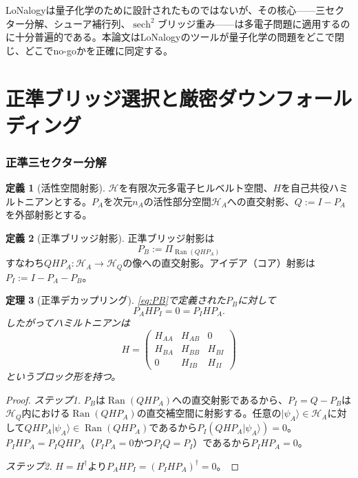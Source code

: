 \documentclass[12pt]{article}
\theoremstyle{plain}
\newtheorem{theorem}{定理}[section]
\theoremstyle{definition}
\newtheorem{definition}[theorem]{定義}
\numberwithin{equation}{section}
\DeclareMathOperator{\Ran}{Ran}
\DeclareMathOperator{\sech}{sech}
\begin{document}
LoNalogyは量子化学のために設計されたものではないが、その核心——三セクター分解、シューア補行列、$\sech^2$ブリッジ重み——は多電子問題に適用するのに十分普遍的である。本論文はLoNalogyのツールが量子化学の問題をどこで閉じ、どこでno-goかを正確に同定する。


\part{正準ブリッジ選択と厳密ダウンフォールディング}

\section{正準三セクター分解}\label{sec:canonical}

\begin{definition}[活性空間射影]\label{def:active}
$\mathcal{H}$を有限次元多電子ヒルベルト空間、$H$を自己共役ハミルトニアンとする。$P_A$を次元$n_A$の活性部分空間$\mathcal{H}_A$への直交射影、$Q:=I-P_A$を外部射影とする。
\end{definition}

\begin{definition}[正準ブリッジ射影]\label{def:bridge}
正準ブリッジ射影は
\begin{equation}\label{eq:PB}
\boxed{P_B := \Pi_{\Ran(QHP_A)}}
\end{equation}
すなわち$QHP_A:\mathcal{H}_A\to\mathcal{H}_Q$の像への直交射影。アイデア（コア）射影は$P_I := I - P_A - P_B$。
\end{definition}

\begin{theorem}[正準デカップリング]\label{thm:decoupling}
\eqref{eq:PB}で定義された$P_B$に対して
\begin{equation}\label{eq:decoupling}
\boxed{P_A H P_I = 0 = P_I H P_A.}
\end{equation}
したがってハミルトニアンは
\begin{equation}\label{eq:blockH}
H = \begin{pmatrix} H_{AA} & H_{AB} & 0\\ H_{BA} & H_{BB} & H_{BI}\\ 0 & H_{IB} & H_{II} \end{pmatrix}
\end{equation}
というブロック形を持つ。
\end{theorem}

\begin{proof}
\emph{ステップ1.} $P_B$は$\Ran(QHP_A)$への直交射影であるから、$P_I=Q-P_B$は$\mathcal{H}_Q$内における$\Ran(QHP_A)$の直交補空間に射影する。任意の$|\psi_A\rangle\in\mathcal{H}_A$に対して$QHP_A|\psi_A\rangle\in\Ran(QHP_A)$であるから$P_I(QHP_A|\psi_A\rangle)=0$。$P_IHP_A=P_IQHP_A$（$P_IP_A=0$かつ$P_IQ=P_I$）であるから$P_IHP_A=0$。

\emph{ステップ2.} $H=H^\dagger$より$P_AHP_I=(P_IHP_A)^\dagger=0$。
\end{proof}
\end{document}
